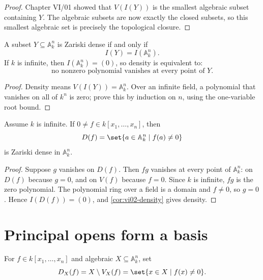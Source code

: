 \begin{proof}
Chapter VI/01 showed that \(V(I(Y))\) is the smallest algebraic subset containing \(Y\).
The algebraic subsets are now exactly the closed subsets, so this smallest algebraic set is
precisely the topological closure.
\end{proof}

\begin{corollary}
\label{cor:vi02-density}
A subset \(Y\subseteq\mathbb A_k^n\) is Zariski dense if and only if
\[
I(Y)=I(\mathbb A_k^n).
\]
If \(k\) is infinite, then \(I(\mathbb A_k^n)=(0)\), so density is equivalent to:
\[
\text{no nonzero polynomial vanishes at every point of }Y.
\]
\end{corollary}

\begin{proof}
Density means \(V(I(Y))=\mathbb A_k^n\).  Over an infinite field, a polynomial that
vanishes on all of \(k^n\) is zero; prove this by induction on \(n\), using the
one-variable root bound.
\end{proof}

\begin{proposition}
\label{prop:vi02-principal-dense}
Assume \(k\) is infinite.  If \(0\neq f\in k[x_1,\dots,x_n]\), then
\[
D(f)=\set{a\in\mathbb A_k^n\mid f(a)\neq0}
\]
is Zariski dense in \(\mathbb A_k^n\).
\end{proposition}

\begin{proof}
Suppose \(g\) vanishes on \(D(f)\).  Then \(fg\) vanishes at every point of
\(\mathbb A_k^n\): on \(D(f)\) because \(g=0\), and on \(V(f)\) because \(f=0\).
Since \(k\) is infinite, \(fg\) is the zero polynomial.  The polynomial ring over a field
is a domain and \(f\neq0\), so \(g=0\).  Hence \(I(D(f))=(0)\), and
\cref{cor:vi02-density} gives density.
\end{proof}

\section{Principal opens form a basis}
\label{sec:vi02-principal-opens}

\begin{definition}
For \(f\in k[x_1,\dots,x_n]\) and algebraic \(X\subseteq\mathbb A_k^n\), set
\[
D_X(f)=X\setminus V_X(f)=\set{x\in X\mid f(x)\neq0}.
\]
\end{definition}

